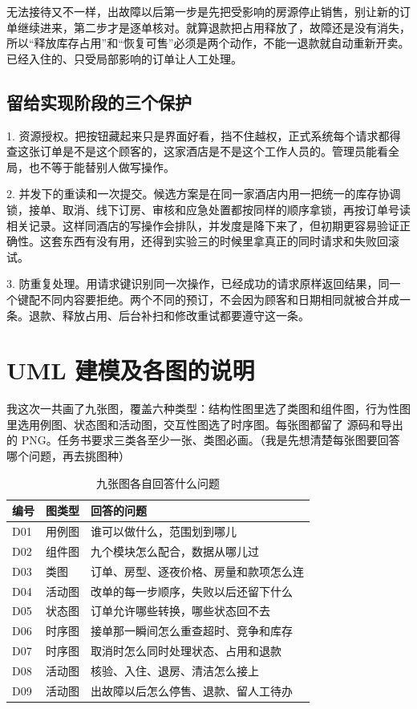 \documentclass[UTF8,a4paper,zihao=-4,fontset=none]{ctexart}
\newcommand{\pathtext}[1]{\texttt{\detokenize{#1}}}
\begin{document}
无法接待又不一样，出故障以后第一步是先把受影响的房源停止销售，别让新的订单继续进来，第二步才是逐单核对。就算退款把占用释放了，故障还是没有消失，所以“释放库存占用”和“恢复可售”必须是两个动作，不能一退款就自动重新开卖。已经入住的、只受局部影响的订单让人工处理。

\subsection{留给实现阶段的三个保护}

1. 资源授权。把按钮藏起来只是界面好看，挡不住越权，正式系统每个请求都得查这张订单是不是这个顾客的，这家酒店是不是这个工作人员的。管理员能看全局，也不等于能替别人做写操作。

2. 并发下的重读和一次提交。候选方案是在同一家酒店内用一把统一的库存协调锁，接单、取消、线下订房、审核和应急处置都按同样的顺序拿锁，再按订单号读相关记录。这样同酒店的写操作会排队，并发度是降下来了，但初期更容易验证正确性。这套东西有没有用，还得到实验三的时候里拿真正的同时请求和失败回滚试。

3. 防重复处理。用请求键识别同一次操作，已经成功的请求原样返回结果，同一个键配不同内容要拒绝。两个不同的预订，不会因为顾客和日期相同就被合并成一条。退款、释放占用、后台补扫和修改重试都要遵守这一条。

\section{UML 建模及各图的说明}\label{sec:uml}
我这次一共画了九张图，覆盖六种类型：结构性图里选了类图和组件图，行为性图里选用例图、状态图和活动图，交互性图选了时序图。每张图都留了 \pathtext{.puml} 源码和导出的 PNG。任务书要求三类各至少一张、类图必画。（我是先想清楚每张图要回答哪个问题，再去挑图种）

\begin{table}[H]\centering\small
\caption{九张图各自回答什么问题}
\begin{tabularx}{\linewidth}{p{14mm}p{25mm}Y}\toprule
编号&图类型&回答的问题\\\midrule
D01&用例图&谁可以做什么，范围划到哪儿\\
D02&组件图&九个模块怎么配合，数据从哪儿过\\
D03&类图&订单、房型、逐夜价格、房量和款项怎么连\\
D04&活动图&改单的每一步顺序，失败以后还留下什么\\
D05&状态图&订单允许哪些转换，哪些状态回不去\\
D06&时序图&接单那一瞬间怎么重查超时、竞争和库存\\
D07&时序图&取消时怎么同时处理状态、占用和退款\\
D08&活动图&核验、入住、退房、清洁怎么接上\\
D09&活动图&出故障以后怎么停售、退款、留人工待办\\\bottomrule
\end{tabularx}\end{table}
\end{document}
